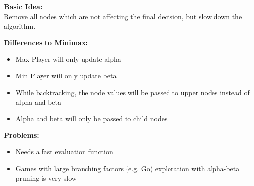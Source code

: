 \documentclass[
../../EiKI_Summary.tex,
]
{subfiles}
\begin{document}
\textbf{Basic Idea:}\\
Remove all nodes which are not affecting the final decision, but slow down the algorithm.

\begin{codebox}
    \begin{algorithm}[H]

    \end{algorithm}
\end{codebox}

\newpage
\textbf{Differences to Minimax:}
\begin{itemize}
    \item Max Player will only update alpha
    \item Min Player will only update beta
    \item While backtracking, the node values will be passed to upper nodes instead of alpha and beta
    \item Alpha and beta will only be passed to child nodes
\end{itemize}

\textbf{Problems:}
\begin{itemize}
    \item Needs a fast evaluation function
    \item Games with large branching factors (e.g. Go) exploration with alpha-beta pruning is very slow
\end{itemize}
\end{document}
